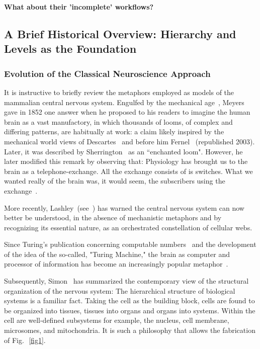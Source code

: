 \documentclass[10pt,letterpaper]{article}
\begin{document}
{\bf What about their 'incomplete' workflows?}

\subsection*{A Brief Historical Overview: Hierarchy and Levels as the Foundation}

\subsubsection*{Evolution of the Classical Neuroscience Approach}

It is instructive to briefly review the metaphors employed as models of the mammalian central nervous system. Engulfed by the mechanical age~\cite{carlyle52}, Meyers~\cite{meyers87} gave in 1852 one answer when he proposed to his readers to imagine the human brain as a vast manufactory, in which thousands of looms, of complex and differing patterns, are habitually at work: a claim likely inspired by the mechanical world views of Descartes~\cite{descartes62} and before him Fernel~\cite{fernel67} (republished 2003). Later, it was described by Sherrington~\cite{sherrington53} as an ``enchanted loom". However, he later modified this remark by observing that: Physiology has brought us to the brain as a telephone-exchange. All the exchange consists of is switches. What we wanted really of the brain was, it would seem, the subscribers using the exchange~\cite{sherrington53}.

More recently, Lashley~(see~\cite{jorgensen21}) has warned the central nervous system can now better be understood, in the absence of mechanistic metaphors and by recognizing its essential nature, as an orchestrated constellation of cellular webs.

Since Turing's publication concerning computable numbers~\cite{turing38} and the development of the idea of the so-called, "Turing Machine," the brain as computer and processor of information has become an increasingly popular metaphor~\cite{matassi23}.

Subsequently, Simon~\cite{simon96a} has summarized the contemporary view of the structural organization of the nervous system: The hierarchical structure of biological systems is a familiar fact. Taking the cell as the building block, cells are found to be organized into tissues, tissues into organs and organs into systems. Within the cell are well-defined subsystems for example, the nucleus, cell membrane, microsomes, and mitochondria. It is such a philosophy that allows the fabrication of Fig.\,~\ref{fig1}.
\end{document}
